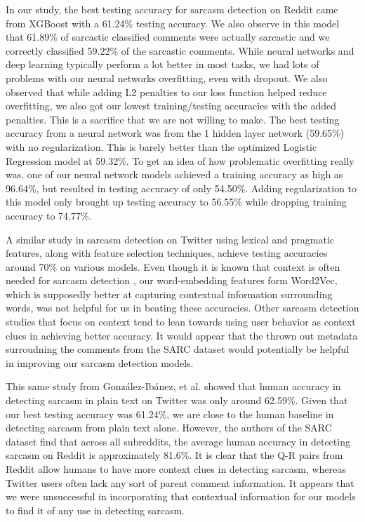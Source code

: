 \documentclass{article}
\begin{document}
In our study, the best testing accuracy for sarcasm detection on Reddit came from XGBoost with a 61.24\% testing accuracy. We also observe in this model that 61.89\% of sarcastic classified comments were actually sarcastic and we correctly classified 59.22\% of the sarcastic comments. While neural networks and deep learning typically perform a lot better in most tasks, we had lots of problems with our neural networks overfitting, even with dropout. We also observed that while adding L2 penalties to our loss function helped reduce overfitting, we also got our lowest training/testing accuracies with the added penalties. This is a sacrifice that we are not willing to make. The best testing accuracy from a neural network was from the 1 hidden layer network (59.65\%) with no regularization. This is barely better than the optimized Logistic Regression model at 59.32\%. To get an idea of how problematic overfitting really was, one of our neural network models achieved a training accuracy as high as 96.64\%, but resulted in testing accuracy of only 54.50\%. Adding regularization to this model only brought up testing accuracy to 56.55\% while dropping training accuracy to 74.77\%. 

A similar study in sarcasm detection on Twitter \citep{gonzalez2011identifying} using lexical and pragmatic features, along with feature selection techniques,  achieve testing accuracies around 70\% on various models. Even though it is known that context is often needed for sarcasm detection \citep{wallace2014humans, bamman2015contextualized}, our word-embedding features form Word2Vec, which is supposedly better at capturing contextual information surrounding words, was not helpful for us in beating these accuracies. Other sarcasm detection studies that focus on context tend to lean towards using user behavior as context clues \citep{bamman2015contextualized, rajadesingan2015sarcasm} in achieving better accuracy. It would appear that the thrown out metadata surroudning the comments from the SARC dataset would potentially be helpful in improving our sarcasm detection models. 

This same study from Gonz{\'a}lez-Ib{\'a}nez, et al. \citep{gonzalez2011identifying} showed that human accuracy in detecting sarcasm in plain text on Twitter was only around 62.59\%. Given that our best testing accuracy was 61.24\%, we are close to the human baseline in detecting sarcasm from plain text alone. However, the authors of the SARC dataset \citep{khodak2017large} find that across all subreddits, the average human accuracy in detecting sarcasm on Reddit is approximately 81.6\%. It is clear that the Q-R pairs from Reddit allow humans to have more context clues in detecting sarcasm, whereas Twitter users often lack any sort of parent comment information. It appears that we were unsuccessful in incorporating that contextual information for our models to find it of any use in detecting sarcasm. 
\end{document}
